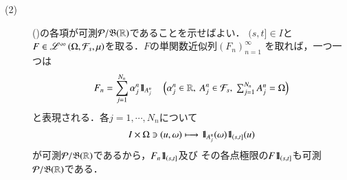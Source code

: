 \begin{prf}
\begin{description}
			\item[(2)] 
				()の各項が可測$\mathcal{P}/\mathfrak{B}(\mathbb{R})$であることを示せばよい．
				$(s,t] \in I$と$F \in \mathscr{L}^{\infty} \left(\Omega,\mathcal{F}_s,\mu\right)$を取る．$F$の単関数近似列$(F_n)_{n=1}^{\infty}$
				を取れば，一つ一つは
				\begin{align}
					F_n = \sum_{j=1}^{N_n} \alpha_j^n \defunc_{A_j^n} \quad \left( \alpha_j^n \in \R,\ A_j^n \in \mathcal{F}_s,\ \mbox{$\sum_{j=1}^{N_n}A_j^n = \Omega$} \right)
				\end{align}
				と表現される．各$j=1,\cdots,N_n$について
				\begin{align}
					I \times \Omega \ni (u,\omega) \longmapsto \mbox{1}\hspace{-0.25em}\mbox{l}_{A_j^n}(\omega) \mbox{1}\hspace{-0.25em}\mbox{l}_{(s,t]}(u)
				\end{align}
				が可測$\mathcal{P}/\mathfrak{B}(\mathbb{R})$であるから，$F_n \mbox{1}\hspace{-0.25em}\mbox{l}_{(s,t]}$及び
				その各点極限の$F \mbox{1}\hspace{-0.25em}\mbox{l}_{(s,t]}$も可測$\mathcal{P}/\mathfrak{B}(\mathbb{R})$である．
			

\end{description}
\end{prf}

